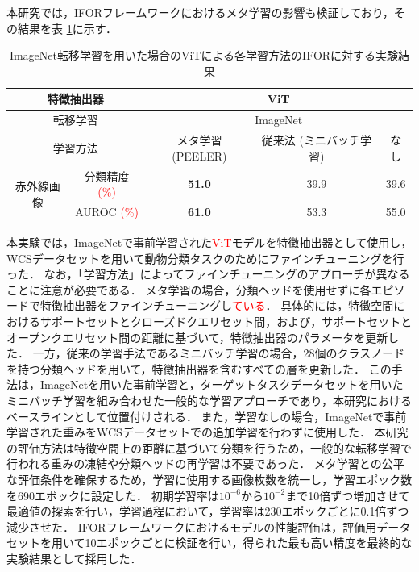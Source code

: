\documentclass[a4paper,11pt,nomag]{jsreport}
\begin{document}
本研究では，IFORフレームワークにおけるメタ学習の影響も検証しており，その結果を表 \ref{tbl:exp2}に示す．
% 
\begin{table}[tbp]
  \centering
  \caption{ImageNet転移学習を用いた場合のViTによる各学習方法のIFORに対する実験結果}
  \label{tbl:exp2}
  \begin{tabular}{cc||c|c|c}
      \hline
      \multicolumn{2}{c||}{特徴抽出器}          &          \multicolumn{3}{c}{ViT}                \\ \hline
      \multicolumn{2}{c||}{転移学習}            &          \multicolumn{3}{c}{ImageNet}           \\ \hline
      \multicolumn{2}{c||}{学習方法}            & メタ学習 (PEELER)  & 従来法 (ミニバッチ学習) & なし  \\ \hline\hline
      \multirow{2}{*}{赤外線画像} & 分類精度 \textcolor{red}{(\%)} &  \textbf{51.0}   &        39.9          & 39.6  \\
                                & AUROC \textcolor{red}{(\%)}   &  \textbf{61.0}   &        53.3          & 55.0  \\ \hline
  \end{tabular}
\end{table}
% 
本実験では，ImageNetで事前学習された\textcolor{red}{ViT}モデルを特徴抽出器として使用し，WCSデータセットを用いて動物分類タスクのためにファインチューニングを行った．
なお，「学習方法」によってファインチューニングのアプローチが異なることに注意が必要である．
メタ学習の場合，分類ヘッドを使用せずに各エピソードで特徴抽出器をファインチューニングし\textcolor{red}{ている}．
具体的には，特徴空間におけるサポートセットとクローズドクエリセット間，および，サポートセットとオープンクエリセット間の距離に基づいて，特徴抽出器のパラメータを更新した．
一方，従来の学習手法であるミニバッチ学習の場合，28個のクラスノードを持つ分類ヘッドを用いて，特徴抽出器を含むすべての層を更新した．
この手法は，ImageNetを用いた事前学習と，ターゲットタスクデータセットを用いたミニバッチ学習を組み合わせた一般的な学習アプローチであり，本研究におけるベースラインとして位置付けされる．
また，学習なしの場合，ImageNetで事前学習された重みをWCSデータセットでの追加学習を行わずに使用した．
本研究の評価方法は特徴空間上の距離に基づいて分類を行うため，一般的な転移学習で行われる重みの凍結や分類ヘッドの再学習は不要であった．
メタ学習との公平な評価条件を確保するため，学習に使用する画像枚数を統一し，学習エポック数を690エポックに設定した．
初期学習率は$10^{-6}$から$10^{-2}$まで10倍ずつ増加させて最適値の探索を行い，学習過程において，学習率は230エポックごとに0.1倍ずつ減少させた．
IFORフレームワークにおけるモデルの性能評価は，評価用データセットを用いて10エポックごとに検証を行い，得られた最も高い精度を最終的な実験結果として採用した．
\end{document}
